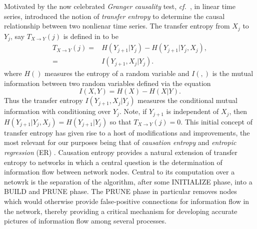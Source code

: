 \documentclass[a4paper,11pt]{article}
\newcommand{\cf}{{\it cf.}~}
\begin{document}
Motivated by the now celebrated {\it Granger causality} test, \cf \cite{granger}, in linear time series, \cite{schreiber} introduced the notion of {\it transfer entropy} to determine the causal relationship between two nonlienar time series.  The transfer entropy from $X_{j}$ to $Y_{j}$, say $T_{X\rightarrow Y}(j)$ is defined in \cite{schreiber} to be 
\begin{align}
T_{X\rightarrow Y}(j) = & H\left(Y_{j+1}|Y_{j}\right) - H\left(Y_{j+1}|Y_{j}, X_{j}\right),  \\
= & I\left(Y_{j+1}, X_{j}|Y_{j} \right).
\end{align}
where $H()$ measures the entropy of a random variable and $I(,)$ is the mutual information between two random variables defined via the equation
\begin{equation}
I(X,Y) = H(X) - H(X|Y).  
\end{equation}
Thus the transfer entropy $I(Y_{j+1},X_{j}|Y_{j})$ measures the conditional mutual information with conditioning over $Y_{j}$.  Note, if $Y_{j+1}$ is independent of $X_{j}$, then $H(Y_{j+1}|Y_{j},X_{j}) = H(Y_{j+1}|Y_{j})$ so that $T_{X\rightarrow Y}(j) = 0$.  This initial concept of transfer entropy has given rise to a host of modifications and improvements, the most relevant for our purposes being that of {\it causation entropy} \cite{bollt} and {\it entropic regression} (ER) \cite{bollt2}.  Causation entropy provides a natural extension of transfer entropy to networks in which a central question is the determination of information flow between network nodes.  Central to its computation over a netowrk is the separation of the algorithm, after some INITIALIZE phase, into a BUILD and PRUNE phase.  The PRUNE phase in particular removes nodes which would otherwise provide false-positive connections for information flow in the network, thereby providing a critical mechanism for developing accurate pictures of information flow among several processes.  
\end{document}
